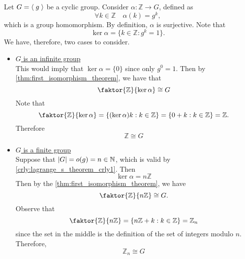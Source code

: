 \begin{eg}
  Let $G = \langle \; g \; \rangle$ be a cyclic group. Consider $\alpha : \mathbb{Z} \to G$, defined as
  \begin{equation*}
    \forall k \in \mathbb{Z} \quad \alpha(k) = g^k,
  \end{equation*}
  which is a group homomorphism. By definition, $\alpha$ is surjective. Note that
  \begin{equation*}
    \ker \alpha = \{k \in \mathbb{Z} : g^k = 1 \}.
  \end{equation*}
  We have, therefore, two cases to consider.
  \begin{itemize}
    \item \underline{$G$ is an infinite group} \\
      This would imply that $\ker \alpha = \{0\}$ since only $g^0 = 1$. Then by \autoref{thm:first_isomorphism_theorem}, we have that
      \begin{equation*}
        \faktor{\mathbb{Z}}{\ker \alpha} \cong G
      \end{equation*}
      Note that
      \begin{equation*}
        \faktor{\mathbb{Z}}{\ker \alpha} = \{ ( \ker \alpha ) k : k \in \mathbb{Z} \} = \{ 0 + k : k \in \mathbb{Z} \} = \mathbb{Z}.
      \end{equation*}
      Therefore
      \begin{equation*}
        \mathbb{Z} \cong G
      \end{equation*}

    \item \underline{$G$ is a finite group} \\
      Suppose that $\left|G\right| = o(g) = n \in \mathbb{N}$, which is valid by \cref{crly:lagrange_s_theorem_crly1}. Then
      \begin{equation*}
        \ker \alpha = n \mathbb{Z}
      \end{equation*}
      Then by the \autoref{thm:first_isomorphism_theorem}, we have
      \begin{equation*}
        \faktor{\mathbb{Z}}{n \mathbb{Z}} \cong G.
      \end{equation*}
      Observe that
      \begin{equation*}
        \faktor{\mathbb{Z}}{n \mathbb{Z}} = \{ n \mathbb{Z} + k : k \in \mathbb{Z} \} = \mathbb{Z}_n
      \end{equation*}
      since the set in the middle is the definition of the set of integers modulo $n$. Therefore,
      \begin{equation*}
        \mathbb{Z}_n \cong G
      \end{equation*}
  \end{itemize}


\end{eg}
